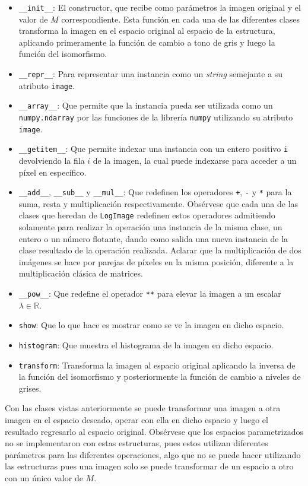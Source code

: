 \begin{itemize}
	\item \verb|__init__|: El constructor, que recibe como par\'ametros la imagen original y el valor de $M$ correspondiente. Esta funci\'on en cada una de las diferentes clases transforma la imagen en el espacio original al espacio de la estructura, aplicando primeramente la funci\'on de cambio a tono de gris y luego la funci\'on del isomorfismo.
	\item \verb|__repr__|: Para representar una instancia como un \textit{string} semejante a su atributo \verb|image|.
	\item \verb|__array__|: Que permite que la instancia pueda ser utilizada como un \verb|numpy.ndarray| por las funciones de la librer\'ia \verb|numpy| utilizando su atributo \verb|image|.
	\item \verb|__getitem__|: Que permite indexar una instancia con un entero positivo \verb|i| devolviendo la fila $i$ de la imagen, la cual puede indexarse para acceder a un p\'ixel en espec\'ifico.
	\item \verb|__add__|, \verb|__sub__| y \verb|__mul__|: Que redefinen los operadores \verb|+|, \verb|-| y \verb|*| para la suma, resta y multiplicaci\'on respectivamente. Obs\'ervese que cada una de las clases que heredan de \verb|LogImage| redefinen estos operadores admitiendo solamente para realizar la operaci\'on una instancia de la misma clase, un entero o un n\'umero flotante, dando como salida una nueva instancia de la clase resultado de la operaci\'on realizada. Aclarar que la multiplicaci\'on de dos im\'agenes se hace por parejas de p\'ixeles en la misma posici\'on, diferente a la multiplicaci\'on cl\'asica de matrices.
	\item \verb|__pow__|: Que redefine el operador \verb|**| para elevar la imagen a un escalar $\lambda\in \mathbb{R}$.
	\item \verb|show|: Que lo que hace es mostrar como se ve la imagen en dicho espacio.
	\item \verb|histogram|: Que muestra el histograma de la imagen en dicho espacio.
	\item \verb|transform|: Transforma la imagen al espacio original aplicando la inversa de la funci\'on del isomorfismo y posteriormente la funci\'on de cambio a niveles de grises.
\end{itemize}

Con las clases vistas anteriormente se puede transformar una imagen a otra imagen en el espacio deseado, operar con ella en dicho espacio y luego el resultado regresarlo al espacio original. Obs\'ervese que los espacios parametrizados no se implementaron con estas estructuras, pues estos utilizan diferentes par\'ametros para las diferentes operaciones, algo que no se puede hacer utilizando las estructuras pues una imagen solo se puede transformar de un espacio a otro con un \'unico valor de $M$.

